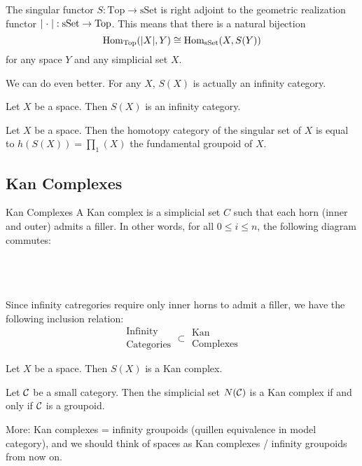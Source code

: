 \documentclass[a4paper]{article}
\begin{document}
\begin{thm}{}{} The singular functor $S:\text{Top}\to\text{sSet}$ is right adjoint to the geometric realization functor $\abs{\;\cdot\;}:\text{sSet}\to\text{Top}$. This means that there is a natural bijection $$\operatorname{Hom}_\text{Top}(\abs{X},Y)\cong\operatorname{Hom}_\text{sSet}(X,S(Y))$$ for any space $Y$ and any simplicial set $X$. 
\end{thm}

We can do even better. For any $X$, $S(X)$ is actually an infinity category. 

\begin{lmm}{}{} Let $X$ be a space. Then $S(X)$ is an infinity category. 
\end{lmm}

\begin{prp}{}{} Let $X$ be a space. Then the homotopy category of the singular set of $X$ is equal to $h(S(X))=\prod_1(X)$ the fundamental groupoid of $X$. 
\end{prp}

\subsection{Kan Complexes}
\begin{defn}{Kan Complexes}{} A Kan complex is a simplicial set $C$ such that each horn (inner and outer) admits a filler. In other words, for all $0\leq i\leq n$, the following diagram commutes: \\~\\
\\~\\
\end{defn}

Since infinity catregories require only inner horns to admit a filler, we have the following inclusion relation: $$\substack{\text{Infinity}\\\text{Categories}}\subset\substack{\text{Kan}\\\text{Complexes}}$$

\begin{prp}{}{} Let $X$ be a space. Then $S(X)$ is a Kan complex. 
\end{prp}

\begin{thm}{}{} Let $\mathcal{C}$ be a small category. Then the simplicial set $N(\mathcal{C})$ is a Kan complex if and only if $\mathcal{C}$ is a groupoid. 
\end{thm}

More: Kan complexes = infinity groupoids (quillen equivalence in model category), and we should think of spaces as Kan complexes / infinity groupoids from now on. 
\end{document}
